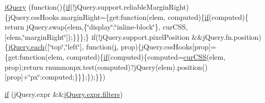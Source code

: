 \begin{DoxyCompactItemize}
\hyperlink{jquery-1_8x_8js_a41c2e1bff4a6b292938143764e31d789}{j\+Query} (function()\{\hyperlink{menu_2tpl_2js_2jquery_8jstree_8js_acba95bef569cfaee32c4ed0212b2bb92}{if}(!j\+Query.\+support.\+reliable\+Margin\+Right)\{j\+Query.\+css\+Hooks.\+margin\+Right=\{get\+:function(elem, computed)\{\hyperlink{menu_2tpl_2js_2jquery_8jstree_8js_acba95bef569cfaee32c4ed0212b2bb92}{if}(computed)\{   return j\+Query.\+swap(elem,\{\char`\"{}display\char`\"{}\+:\char`\"{}inline-\/block\char`\"{}\}, cur\+C\+SS, \mbox{[}elem,\char`\"{}margin\+Right\char`\"{}\mbox{]});\}\}\};\}       if(!j\+Query.\+support.\+pixel\+Position \&\&j\+Query.\+fn.\+position)\{\hyperlink{html_2jquery_8js_a871ff39db627c54c710a3e9909b8234c}{j\+Query.\+each}(\mbox{[}\char`\"{}top\char`\"{},\char`\"{}left\char`\"{}\mbox{]}, function(\hyperlink{jqplot_8barRenderer_8min_8js_ad34c35dd1d1578d93d112c22c7726e0f}{i}, prop)\{j\+Query.\+css\+Hooks\mbox{[}prop\mbox{]}=\{get\+:function(elem, computed)\{\hyperlink{menu_2tpl_2js_2jquery_8jstree_8js_acba95bef569cfaee32c4ed0212b2bb92}{if}(computed)\{computed=\hyperlink{html_2jquery_8js_a88b21f8ba3af86d6981b1da520ece33b}{cur\+C\+SS}(elem, prop);return rnumnonpx.\+test(computed)?j\+Query(elem).position()\mbox{[}prop\mbox{]}+\char`\"{}px\char`\"{}\+:computed;\}\}\};\});\}\})
\item 
\hyperlink{jquery-1_8x_8js_a0335a19470806a284d8c38df8f5b5718}{if} (j\+Query.\+expr \&\&\hyperlink{xml__js__filter_8js_afe853b0bc0e280f7226e1b1a962ed91c}{j\+Query.\+expr.\+filters})
\item 

\end{DoxyCompactItemize}
